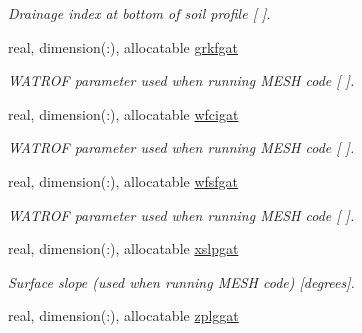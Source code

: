 \begin{DoxyCompactItemize}
\begin{DoxyCompactList}\small\item\em Drainage index at bottom of soil profile \mbox{[} \mbox{]}. \end{DoxyCompactList}\item 
\hypertarget{structclass__statevars_1_1class__gather_a02cd8e5894dcb71ff342a363d7142047}{}real, dimension(\+:), allocatable \hyperlink{structclass__statevars_1_1class__gather_a02cd8e5894dcb71ff342a363d7142047}{grkfgat}\label{structclass__statevars_1_1class__gather_a02cd8e5894dcb71ff342a363d7142047}

\begin{DoxyCompactList}\small\item\em W\+A\+T\+R\+O\+F parameter used when running M\+E\+S\+H code \mbox{[} \mbox{]}. \end{DoxyCompactList}\item 
\hypertarget{structclass__statevars_1_1class__gather_a398fe12fd0978b91e55adf716a4670df}{}real, dimension(\+:), allocatable \hyperlink{structclass__statevars_1_1class__gather_a398fe12fd0978b91e55adf716a4670df}{wfcigat}\label{structclass__statevars_1_1class__gather_a398fe12fd0978b91e55adf716a4670df}

\begin{DoxyCompactList}\small\item\em W\+A\+T\+R\+O\+F parameter used when running M\+E\+S\+H code \mbox{[} \mbox{]}. \end{DoxyCompactList}\item 
\hypertarget{structclass__statevars_1_1class__gather_a3cc2c55be7ef09c997148115afc15112}{}real, dimension(\+:), allocatable \hyperlink{structclass__statevars_1_1class__gather_a3cc2c55be7ef09c997148115afc15112}{wfsfgat}\label{structclass__statevars_1_1class__gather_a3cc2c55be7ef09c997148115afc15112}

\begin{DoxyCompactList}\small\item\em W\+A\+T\+R\+O\+F parameter used when running M\+E\+S\+H code \mbox{[} \mbox{]}. \end{DoxyCompactList}\item 
\hypertarget{structclass__statevars_1_1class__gather_aa6894254b1a2e3febf4147b9f94b0771}{}real, dimension(\+:), allocatable \hyperlink{structclass__statevars_1_1class__gather_aa6894254b1a2e3febf4147b9f94b0771}{xslpgat}\label{structclass__statevars_1_1class__gather_aa6894254b1a2e3febf4147b9f94b0771}

\begin{DoxyCompactList}\small\item\em Surface slope (used when running M\+E\+S\+H code) \mbox{[}degrees\mbox{]}. \end{DoxyCompactList}\item 
\hypertarget{structclass__statevars_1_1class__gather_a778ab1a95addad57fd3a5a1edadad83b}{}real, dimension(\+:), allocatable \hyperlink{structclass__statevars_1_1class__gather_a778ab1a95addad57fd3a5a1edadad83b}{zplggat}\label{structclass__statevars_1_1class__gather_a778ab1a95addad57fd3a5a1edadad83b}


\end{DoxyCompactItemize}
